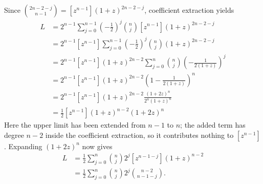 Since $\binom{2n - 2 - j}{n - 1} = [z^{n - 1}] (1 + z)^{2n - 2 - j}$, coefficient extraction yields
\begin{equation*}
    \begin{aligned}
        L
        &= 2^{n - 1} \sum_{j = 0}^{n - 1} \left(-\frac{1}{2} \right)^{j} \binom{n}{j} [z^{n - 1}] (1 + z)^{2n - 2 - j} \\
        &= 2^{n - 1}[z^{n - 1}] \sum_{j = 0}^{n - 1} \left(-\frac{1}{2} \right)^{j} \binom{n}{j}(1 + z)^{2n - 2 - j} \\
        &= 2^{n - 1}[z^{n - 1}] (1 + z)^{2n - 2} \sum_{j = 0}^{n} \binom{n}{j} \left(-\frac{1}{2(1 + z)} \right)^{j} \\
        &= 2^{n - 1}[z^{n - 1}] (1 + z)^{2n - 2}\left(1 - \frac{1}{2(1 + z)} \right)^{n} \\
        &= 2^{n - 1}[z^{n - 1}] (1 + z)^{2n - 2} \frac{(1 + 2z)^{n}}{2^{n}(1 + z)^{n}} \\
        &= \frac{1}{2} [z^{n - 1}] (1 + z)^{n - 2}(1 + 2z)^{n}
    \end{aligned}
\end{equation*}
Here the upper limit has been extended from $n - 1$ to $n$; the added term has degree
$n - 2$ inside the coefficient extraction, so it contributes nothing to $[z^{n - 1}]$.
Expanding $(1 + 2z)^{n}$ now gives
\begin{equation*}
    \begin{aligned}
        L
        &= \frac{1}{2} \sum_{j = 0}^{n} \binom{n}{j} 2^{j} [z^{n - 1 - j}] (1 + z)^{n - 2} \\
        &= \frac{1}{2} \sum_{j = 0}^{n} \binom{n}{j} 2^{j} \binom{n - 2}{n - 1 - j}.
    \end{aligned}
\end{equation*}

